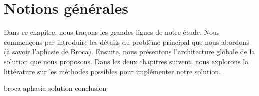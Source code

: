 \chapter{Notions générales}
\label{chap.general-notions}

Dans ce chapitre, nous traçons les grandes lignes de notre étude.
Nous commençons par introduire les détails du problème principal que nous abordons 
(à savoir l'aphasie de Broca).
Ensuite, nous présentons l'architecture globale de la solution que nous proposons.
Dans les deux chapitres suivent, 
nous explorons la littérature sur les méthodes possibles pour implémenter notre solution.

{broca-aphasia}
{solution}
\pagebreak
{conclusion}
